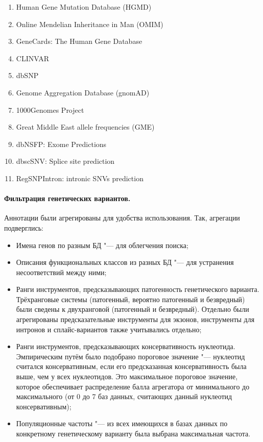 \documentclass[a4paper,14pt]{extarticle}
\begin{document}
\begin{enumerate}
	\item Human Gene Mutation Database (HGMD\textregistered)\,\citep{Stenson_2017}
	\item Online Mendelian Inheritance in Man (OMIM\textregistered)\,\citep{Amberger_2014}
	\item GeneCards\textregistered: The Human Gene Database\,\citep{Stelzer_2016}
	\item CLINVAR\,\citep{Landrum_2017}
	\item dbSNP\,\citep{Sherry_2001}
	\item Genome Aggregation Database (gnomAD)\,\citep{Karczewski_2020}
	\item 1000Genomes Project\,\citep{Auton_2015}
	\item Great Middle East allele frequencies (GME)\,\citep{Scott_2016}
	\item dbNSFP: Exome Predictions\,\citep{Liu_2016}
	\item dbscSNV: Splice site prediction\,\citep{Jian_2013}
	\item RegSNPIntron: intronic SNVs prediction\,\citep{Lin_2019}
\end{enumerate}

\paragraph{Фильтрация генетических вариантов.}
Аннотации были агрегированы для удобства использования.
Так, агрегации подверглись:

\begin{itemize}
	\item Имена генов по разным БД "--- для облегчения поиска;
	\item Описания функциональных классов из разных БД "--- для устранения несоответствий между ними;
	\item Ранги инструментов, предсказывающих патогенность генетического варианта.
	      Трёхранговые системы (патогенный, вероятно патогенный и безвредный) были сведены к двухранговой (патогенный и безвредный).
	      Отдельно были агрегированы предсказательные инструменты для экзонов, инструменты для интронов и сплайс-вариантов также учитывались отдельно;
	\item Ранги инструментов, предсказывающих консервативность нуклеотида.
	      Эмпирическим путём было подобрано пороговое значение  "--- нуклеотид считался консервативным, если его предсказанная консервативность была выше, чем у  всех нуклеотидов.
	      Это максимальное пороговое значение, которое обеспечивает распределение балла агрегатора от минимального до максимального (от 0 до 7 баз данных, считающих данный нуклеотид консервативным);
	\item Популяционные частоты "--- из всех имеющихся в базах данных по конкретному генетическому варианту была выбрана максимальная частота.
\end{itemize}
\end{document}
